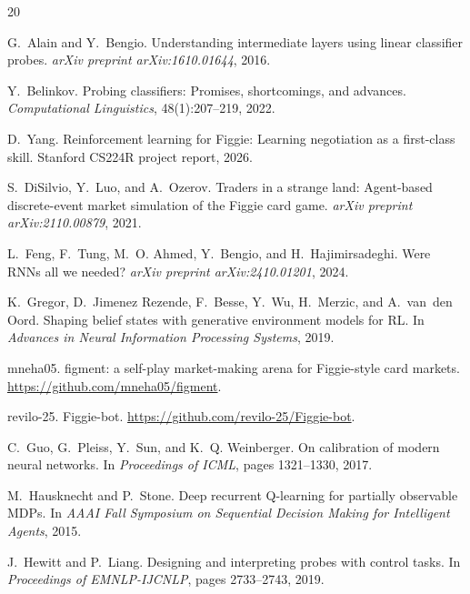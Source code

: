 \documentclass{article}
\begin{document}
\small
\begin{thebibliography}{20}

G.~Alain and Y.~Bengio.
\newblock Understanding intermediate layers using linear classifier probes.
\newblock \emph{arXiv preprint arXiv:1610.01644}, 2016.

Y.~Belinkov.
\newblock Probing classifiers: Promises, shortcomings, and advances.
\newblock \emph{Computational Linguistics}, 48(1):207--219, 2022.

D.~Yang.
\newblock Reinforcement learning for Figgie: Learning negotiation as a first-class skill.
\newblock Stanford CS224R project report, 2026.

S.~DiSilvio, Y.~Luo, and A.~Ozerov.
\newblock Traders in a strange land: Agent-based discrete-event market simulation of the Figgie card game.
\newblock \emph{arXiv preprint arXiv:2110.00879}, 2021.

L.~Feng, F.~Tung, M.~O. Ahmed, Y.~Bengio, and H.~Hajimirsadeghi.
\newblock Were RNNs all we needed?
\newblock \emph{arXiv preprint arXiv:2410.01201}, 2024.

K.~Gregor, D.~Jimenez Rezende, F.~Besse, Y.~Wu, H.~Merzic, and A.~van~den Oord.
\newblock Shaping belief states with generative environment models for RL.
\newblock In \emph{Advances in Neural Information Processing Systems}, 2019.

 mneha05.
\newblock figment: a self-play market-making arena for Figgie-style card markets.
\newblock \url{https://github.com/mneha05/figment}.

 revilo-25.
\newblock Figgie-bot.
\newblock \url{https://github.com/revilo-25/Figgie-bot}.

C.~Guo, G.~Pleiss, Y.~Sun, and K.~Q. Weinberger.
\newblock On calibration of modern neural networks.
\newblock In \emph{Proceedings of ICML}, pages 1321--1330, 2017.

M.~Hausknecht and P.~Stone.
\newblock Deep recurrent Q-learning for partially observable MDPs.
\newblock In \emph{AAAI Fall Symposium on Sequential Decision Making for Intelligent Agents}, 2015.

J.~Hewitt and P.~Liang.
\newblock Designing and interpreting probes with control tasks.
\newblock In \emph{Proceedings of EMNLP-IJCNLP}, pages 2733--2743, 2019.


\end{thebibliography}
\end{document}

